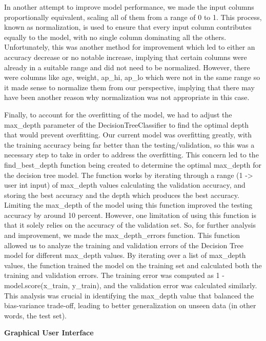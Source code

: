 ﻿\documentclass[12pt]{article}
\begin{document}
In another attempt to improve model performance, we made the input columns proportionally equivalent, scaling all of them from a range of 0 to 1. This process, known as normalization, is used to ensure that every input column contributes equally to the model, with no single column dominating all the others. Unfortunately, this was another method for improvement which led to either an accuracy decrease or no notable increase, implying that certain columns were already in a suitable range and did not need to be normalized. However, there were columns like age, weight, ap\_hi, ap\_lo which were not in the same range so it made sense to normalize them from our perspective, implying that there may have been another reason why normalization was not appropriate in this case.

Finally, to account for the overfitting of the model, we had to adjust the max\_depth parameter of the DecisionTreeClassifier to find the optimal depth that would prevent overfitting. Our current model was overfitting greatly, with the training accuracy being far better than the testing/validation, so this was a necessary step to take in order to address the overfitting. This concern led to the find\_best\_depth function being created to determine the optimal max\_depth for the decision tree model. The function works by iterating through a range (1 -> user int input) of max\_depth values calculating the validation accuracy, and storing the best accuracy and the depth which produces the best accuracy. Limiting the max\_depth of the model using this function improved the testing accuracy by around 10 percent. However, one limitation of using this function is that it solely relies on the accuracy of the validation set. So, for further analysis and improvement, we made the max\_depth\_errors function. This function allowed us to analyze the training and validation errors of the Decision Tree model for different max\_depth values. By iterating over a list of max\_depth values, the function trained the model on the training set and calculated both the training and validation errors. The training error was computed as 1 - model.score(x\_train, y\_train), and the validation error was calculated similarly. This analysis was crucial in identifying the max\_depth value that balanced the bias-variance trade-off, leading to better generalization on unseen data (in other words, the test set). 

\vspace{5mm}
\textbf{Graphical User Interface}
\end{document}
